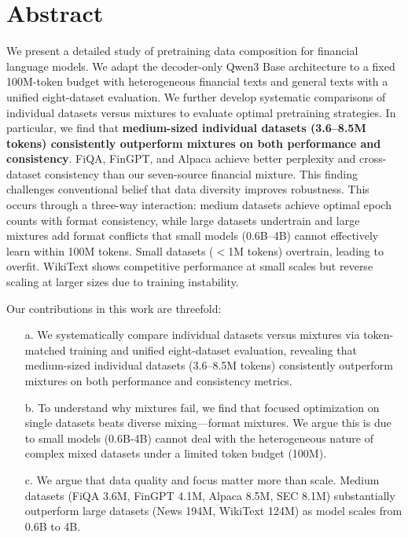 \documentclass[11pt,a4paper,english,oneside]{book}
\begin{document}
\thispagestyle{empty}
\titleGP

\newpage

\setcounter{page}{1}

\section*{Abstract}
\thispagestyle{firststyle}

We present a detailed study of pretraining data composition for financial language models. We adapt the decoder-only Qwen3 Base architecture to a fixed 100M-token budget with heterogeneous financial texts and general texts with a unified eight-dataset evaluation. We further develop systematic comparisons of individual datasets versus mixtures to evaluate optimal pretraining strategies. In particular, we find that \textbf{medium-sized individual datasets (3.6–8.5M tokens) consistently outperform mixtures on both performance and consistency}. FiQA, FinGPT, and Alpaca achieve better perplexity and cross-dataset consistency than our seven-source financial mixture. This finding challenges conventional belief that data diversity improves robustness. This occurs through a three-way interaction: medium datasets achieve optimal epoch counts with format consistency, while large datasets undertrain and large mixtures add format conflicts that small models (0.6B–4B) cannot effectively learn within 100M tokens. Small datasets ($<$1M tokens) overtrain, leading to overfit. WikiText shows competitive performance at small scales but reverse scaling at larger sizes due to training instability.

Our contributions in this work are threefold:

\begin{itemize}
    \item[a.] We systematically compare individual datasets versus mixtures via token-matched training and unified eight-dataset evaluation, revealing that medium-sized individual datasets (3.6–8.5M tokens) consistently outperform mixtures on both performance and consistency metrics.

    \item[b.] To understand why mixtures fail, we find that focused optimization on single datasets beats diverse mixing—format mixtures. We argue this is due to small models (0.6B-4B) cannot deal with the heterogeneous nature of complex mixed datasets under a limited token budget (100M).

    \item[c.] We argue that data quality and focus matter more than scale. Medium datasets (FiQA 3.6M, FinGPT 4.1M, Alpaca 8.5M, SEC 8.1M) substantially outperform large datasets (News 194M, WikiText 124M) as model scales from 0.6B to 4B.
\end{itemize}
\end{document}
